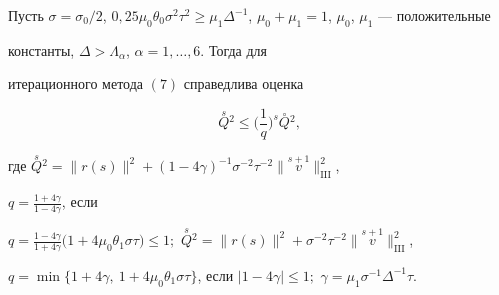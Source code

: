 \begin{thm}


Пусть $\sigma=\sigma_0/2$, $0,25\mu_0\theta_0\sigma^2\tau^2\geq


\mu_1\Delta^{-1}$, $\mu_0+\mu_1=1$, $\mu_0$, $\mu_1$ --- положительные


константы, $\Delta>\Lambda_\alpha$, $\alpha=1,\dotsc,6$. Тогда для


итерационного метода $(7)$ справедлива оценка


$$


\overset{s}{Q}{}^{2} \le \bigg(\frac{1}{q}\bigg)^{s}


\overset{\circ}{Q}{}^{2},


$$


где $\overset{s}{Q}{}^{2}=\|r(s)\|^2+(1-4\gamma)^{-1}\sigma^{-2}


\tau^{-2}\|\overset{s+1}{v}\big\|_{\mathrm{III}}^2$,


$q=\frac{1+4\gamma}{1-4\gamma}$, если


$q=\frac{1-4\gamma}{1+4\gamma}\bigl(1+4\mu_0\theta_1\sigma\tau


\bigr)\leq 1;$ $\overset{s}{Q}{}^{2}=\|r(s)\|^2+\sigma^{-2}\tau^{-2}


\|\overset{s+1}{v}\big\|_{\mathrm{III}}^2$,


$q=\min\{1+4\gamma,\ 1+4\mu_0\theta_1


\sigma\tau\}$, если $|1-4\gamma|\leq 1;$ $\gamma=\mu_1\sigma^{-1}\Delta^{-1}


\tau$.


\end{thm}





